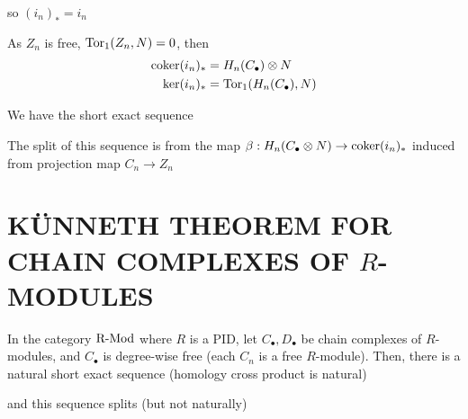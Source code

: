 \documentclass{article}
\begin{document}
\begin{longproof}
    so $(i_n)_* = i_n$

    
    \begin{center}
    \end{center}
    
    As $Z_n$ is free, $\operatorname{Tor}_1(Z_n, N) = 0$,  then 
    \begin{align*}
        \operatorname{coker}(i_n)_* &= H_n(C_\bullet) \otimes N \\
        \ker (i_n)_* &= \operatorname{Tor}_1(H_n(C_\bullet), N)
    \end{align*}
    
    We have the short exact sequence

    \begin{center}
    \end{center}

    The split of this sequence is from the map $\beta: H_n(C_\bullet \otimes N) \to \operatorname{coker}(i_n)_*$ induced from projection map $C_n \to Z_n$
\end{longproof}










\section{KÜNNETH THEOREM FOR CHAIN COMPLEXES OF $R$-MODULES}

\begin{theorem}
    In the category $\operatorname{R-Mod}$ where $R$ is a PID, let $C_\bullet, D_\bullet$ be chain complexes of $R$-modules, and $C_\bullet$ is degree-wise free (each $C_n$ is a free $R$-module). Then, there is a natural short exact sequence (homology cross product is natural)
    \begin{center}
    \end{center}
    and this sequence splits (but not naturally)
\end{theorem}
\end{document}
